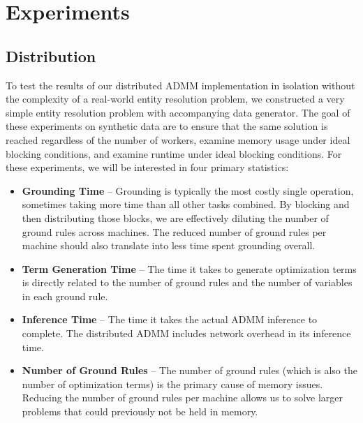 \documentclass{article}
\begin{document}
\section{Experiments}
    
    \subsection{Distribution}
    
        To test the results of our distributed ADMM implementation in isolation without the complexity of a real-world entity resolution problem, we constructed a very simple entity resolution problem with accompanying data generator.
        The goal of these experiments on synthetic data are to ensure that the same solution is reached regardless of the number of workers, examine memory usage under ideal blocking conditions, and examine runtime under ideal blocking conditions.
        For these experiments, we will be interested in four primary statistics:
        \begin{itemize}
            \item \textbf{Grounding Time} --
            Grounding is typically the most costly single operation, sometimes taking more time than all other tasks combined.
            By blocking and then distributing those blocks, we are effectively diluting the number of ground rules across machines.
            The reduced number of ground rules per machine should also translate into less time spent grounding overall.
            
            \item \textbf{Term Generation Time} --
            The time it takes to generate optimization terms is directly related to the number of ground rules and the number of variables in each ground rule.
            
            \item \textbf{Inference Time} --
            The time it takes the actual ADMM inference to complete.
            The distributed ADMM includes network overhead in its inference time.
            
            \item \textbf{Number of Ground Rules} --
            The number of ground rules (which is also the number of optimization terms) is the primary cause of memory issues.
            Reducing the number of ground rules per machine allows us to solve larger problems that could previously not be held in memory.
        \end{itemize}
    
\end{document}
